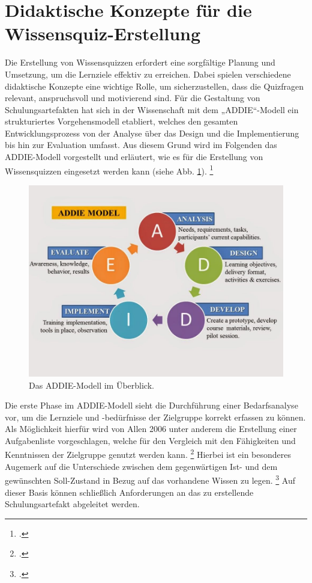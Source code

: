 \section{Didaktische Konzepte für die Wissensquiz-Erstellung}
Die Erstellung von Wissensquizzen erfordert eine sorgfältige Planung und Umsetzung, um die Lernziele effektiv zu erreichen.
Dabei spielen verschiedene didaktische Konzepte eine wichtige Rolle, um sicherzustellen, dass die Quizfragen relevant, anspruchsvoll und motivierend sind.
Für die Gestaltung von Schulungsartefakten
hat sich in der Wissenschaft mit dem „\ac{ADDIE}“-Modell ein strukturiertes
Vorgehensmodell etabliert, welches den gesamten Entwicklungsprozess von der Analyse über das Design und die Implementierung bis hin zur Evaluation umfasst.
Aus diesem Grund wird im Folgenden das \ac{ADDIE}-Modell vorgestellt und erläutert, wie es für die Erstellung von Wissensquizzen eingesetzt werden kann (siehe Abb. \ref{fig:mondrian}).
\footcite[Vgl.][1805]{nadiyahDevelopmentOnlineProject2015}
\begin{figure}[H]
    \centering
    \includegraphics[width=1.0\linewidth]{graphics/addie_model.jpg}
    \caption[Das \acs{ADDIE}-Modell im Überblick.]{Das \ac{ADDIE}-Modell im Überblick.\protect\footnotemark}
    \label{fig:mondrian}
\end{figure}
Die erste Phase im \ac{ADDIE}-Modell sieht die Durchführung einer Bedarfsanalyse vor, um die Lernziele und -bedürfnisse der Zielgruppe korrekt erfassen zu können.
Als Möglichkeit hierfür wird von Allen 2006 unter anderem die Erstellung einer Aufgabenliste vorgeschlagen, welche für
den Vergleich mit den Fähigkeiten und Kenntnissen der Zielgruppe genutzt werden kann.
\footcite[Vgl.][436]{allenOverviewEvolutionADDIE2006}
Hierbei ist ein besonderes Augemerk auf die Unterschiede zwischen dem gegenwärtigen Ist- und dem gewünschten Soll-Zustand in Bezug auf das vorhandene Wissen zu legen.
\footcite[Vgl.][436]{allenOverviewEvolutionADDIE2006}
Auf dieser Basis können schließlich Anforderungen an das zu erstellende Schulungsartefakt abgeleitet werden.

